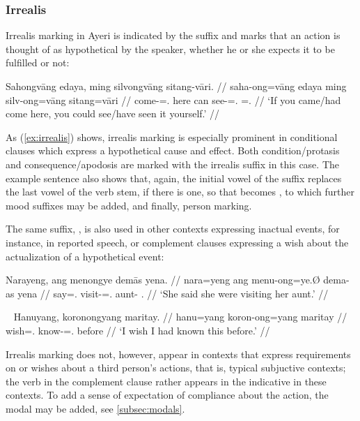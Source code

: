 \subsubsection{Irrealis}

Irrealis marking in Ayeri is indicated by the suffix  and 
marks that an action is thought of as hypothetical by the speaker, whether he 
or she expects it to be fulfilled or not:

\ex\label{ex:irrealis}\begingl
	\gla Sahongvāng edaya, ming silvongvāng sitang-vāri. //
	\glb saha-ong=vāng edaya ming silv-ong=vāng sitang=vāri //
	\glb come-\Irr{}=\Ssg{}.\Aarg{} here can see-\Irr{}=\Ssg{}.\Aarg{} 
		\Refl{}=\Ssg{}.\Ins{} //
	\glft `If you came/had come here, you could see/have seen it  
		yourself.' //
\endgl\xe

As (\ref{ex:irrealis}) shows, irrealis marking is especially prominent in
conditional clauses which express a hypothetical cause and effect. Both
condition/protasis and consequence/apodosis are marked with the irrealis suffix
in this case. The example sentence also shows that, again, the initial vowel of
the suffix replaces the last vowel of the verb stem, if there is one, so that
 becomes , to which further mood
suffixes may be added, and finally, person marking.

The same suffix, , is also used in other contexts expressing 
inactual events, for instance, in reported speech, or complement clauses 
expressing a wish about the actualization of a hypothetical event:

\ex\begingl
	\gla Narayeng, ang menongye demās yena. //
	\glb nara=yeng ang menu-ong=ye.Ø dema-as yena //
	\glc say=\TsgF{}.\Aarg{} \AgtT{} visit-\Irr{}=\TsgF{}.\Top{} 
		aunt-\Parg{} \TsgF{}.\Gen{} //
	\glft `She said she were visiting her aunt.' //
\endgl\xe

\ex~\begingl
	\gla Hanuyang, koronongyang maritay. //
	\glb hanu=yang koron-ong=yang maritay //
	\glc wish=\Fsg{}.\Aarg{} know-\Irr{}=\Fsg{}.\Aarg{} before //
	\glft `I wish I had known this before.' //
\endgl\xe

Irrealis marking does not, however, appear in contexts that express
requirements on or wishes about a third person's actions, that is, typical
subjuctive contexts; the verb in the complement clause rather appears in the
indicative in these contexts. To add a sense of expectation of compliance about
the action, the modal  may be added, see
\autoref{subsec:modals}.

